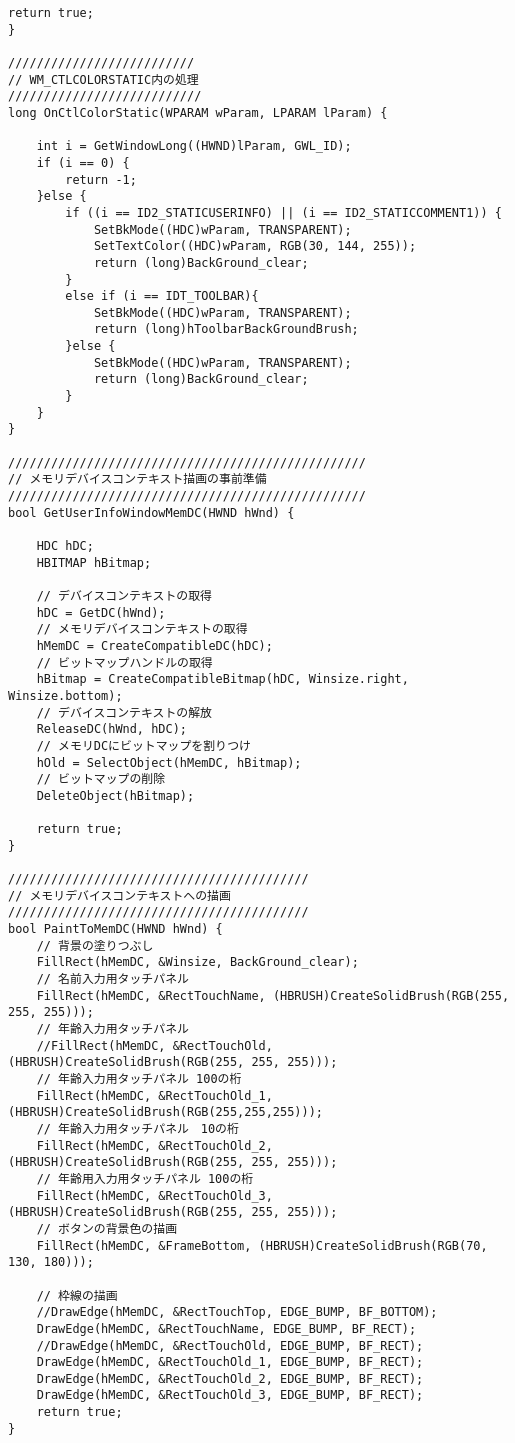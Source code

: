 \begin{lstlisting}[caption=UserInfoWindow.cpp]
	return true;
}

//////////////////////////
// WM_CTLCOLORSTATIC内の処理
///////////////////////////
long OnCtlColorStatic(WPARAM wParam, LPARAM lParam) {

	int i = GetWindowLong((HWND)lParam, GWL_ID);
	if (i == 0) {
		return -1;
	}else {
		if ((i == ID2_STATICUSERINFO) || (i == ID2_STATICCOMMENT1)) {
			SetBkMode((HDC)wParam, TRANSPARENT);
			SetTextColor((HDC)wParam, RGB(30, 144, 255));
			return (long)BackGround_clear;
		}
		else if (i == IDT_TOOLBAR){
			SetBkMode((HDC)wParam, TRANSPARENT);
			return (long)hToolbarBackGroundBrush;
		}else {
			SetBkMode((HDC)wParam, TRANSPARENT);
			return (long)BackGround_clear;
		}
	}
}

//////////////////////////////////////////////////
// メモリデバイスコンテキスト描画の事前準備
//////////////////////////////////////////////////
bool GetUserInfoWindowMemDC(HWND hWnd) {

	HDC hDC;
	HBITMAP hBitmap;
	
	// デバイスコンテキストの取得
	hDC = GetDC(hWnd);
	// メモリデバイスコンテキストの取得
	hMemDC = CreateCompatibleDC(hDC);
	// ビットマップハンドルの取得
	hBitmap = CreateCompatibleBitmap(hDC, Winsize.right, Winsize.bottom);
	// デバイスコンテキストの解放
	ReleaseDC(hWnd, hDC);
	// メモリDCにビットマップを割りつけ
	hOld = SelectObject(hMemDC, hBitmap);
	// ビットマップの削除
	DeleteObject(hBitmap);

	return true;
}

//////////////////////////////////////////
// メモリデバイスコンテキストへの描画
//////////////////////////////////////////
bool PaintToMemDC(HWND hWnd) {
	// 背景の塗りつぶし
	FillRect(hMemDC, &Winsize, BackGround_clear);
	// 名前入力用タッチパネル
	FillRect(hMemDC, &RectTouchName, (HBRUSH)CreateSolidBrush(RGB(255, 255, 255))); 
	// 年齢入力用タッチパネル
	//FillRect(hMemDC, &RectTouchOld, (HBRUSH)CreateSolidBrush(RGB(255, 255, 255)));
	// 年齢入力用タッチパネル 100の桁
	FillRect(hMemDC, &RectTouchOld_1, (HBRUSH)CreateSolidBrush(RGB(255,255,255)));
	// 年齢入力用タッチパネル　10の桁
	FillRect(hMemDC, &RectTouchOld_2, (HBRUSH)CreateSolidBrush(RGB(255, 255, 255)));
	// 年齢用入力用タッチパネル 100の桁
	FillRect(hMemDC, &RectTouchOld_3, (HBRUSH)CreateSolidBrush(RGB(255, 255, 255)));
	// ボタンの背景色の描画
	FillRect(hMemDC, &FrameBottom, (HBRUSH)CreateSolidBrush(RGB(70, 130, 180)));

	// 枠線の描画
	//DrawEdge(hMemDC, &RectTouchTop, EDGE_BUMP, BF_BOTTOM);
	DrawEdge(hMemDC, &RectTouchName, EDGE_BUMP, BF_RECT);
	//DrawEdge(hMemDC, &RectTouchOld, EDGE_BUMP, BF_RECT);
	DrawEdge(hMemDC, &RectTouchOld_1, EDGE_BUMP, BF_RECT);
	DrawEdge(hMemDC, &RectTouchOld_2, EDGE_BUMP, BF_RECT);
	DrawEdge(hMemDC, &RectTouchOld_3, EDGE_BUMP, BF_RECT);
	return true;
}


\end{lstlisting}
